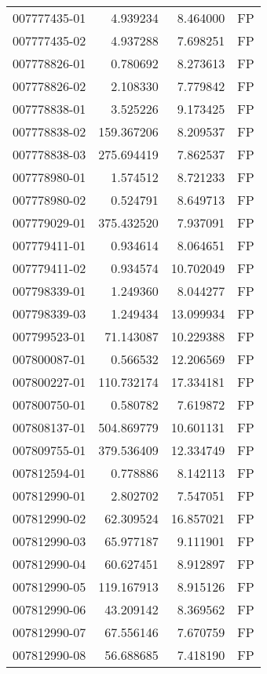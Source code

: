 \begin{tabular}{lrrl}
007777435-01 &    4.939234 &     8.464000 &   FP \\
007777435-02 &    4.937288 &     7.698251 &   FP \\
007778826-01 &    0.780692 &     8.273613 &   FP \\
007778826-02 &    2.108330 &     7.779842 &   FP \\
007778838-01 &    3.525226 &     9.173425 &   FP \\
007778838-02 &  159.367206 &     8.209537 &   FP \\
007778838-03 &  275.694419 &     7.862537 &   FP \\
007778980-01 &    1.574512 &     8.721233 &   FP \\
007778980-02 &    0.524791 &     8.649713 &   FP \\
007779029-01 &  375.432520 &     7.937091 &   FP \\
007779411-01 &    0.934614 &     8.064651 &   FP \\
007779411-02 &    0.934574 &    10.702049 &   FP \\
007798339-01 &    1.249360 &     8.044277 &   FP \\
007798339-03 &    1.249434 &    13.099934 &   FP \\
007799523-01 &   71.143087 &    10.229388 &   FP \\
007800087-01 &    0.566532 &    12.206569 &   FP \\
007800227-01 &  110.732174 &    17.334181 &   FP \\
007800750-01 &    0.580782 &     7.619872 &   FP \\
007808137-01 &  504.869779 &    10.601131 &   FP \\
007809755-01 &  379.536409 &    12.334749 &   FP \\
007812594-01 &    0.778886 &     8.142113 &   FP \\
007812990-01 &    2.802702 &     7.547051 &   FP \\
007812990-02 &   62.309524 &    16.857021 &   FP \\
007812990-03 &   65.977187 &     9.111901 &   FP \\
007812990-04 &   60.627451 &     8.912897 &   FP \\
007812990-05 &  119.167913 &     8.915126 &   FP \\
007812990-06 &   43.209142 &     8.369562 &   FP \\
007812990-07 &   67.556146 &     7.670759 &   FP \\
007812990-08 &   56.688685 &     7.418190 &   FP \\

\end{tabular}

